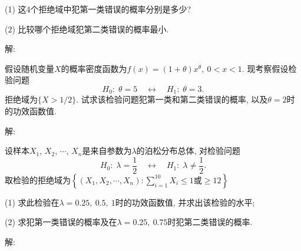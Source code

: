 \documentclass[standard]{ExBook}
\begin{document}
\begin{qitems}
\begin{bbox}
\begin{shaded}
(1) 这4个拒绝域中犯第一类错误的概率分别是多少?

(2) 比较哪个拒绝域犯第二类错误的概率最小.
    \end{shaded}
    \end{bbox}

\vspace{-5em}

    \begin{bbox}
解: 
    \end{bbox}

\vspace{-5em}

    \begin{bbox} 
    \begin{shaded}
        \qitem
假设随机变量$X$的概率密度函数为$f(x) = (1 + \theta)x^{\theta},\ 0 < x < 1$. 现考察假设检验问题
\[
H_0: \; \theta = 5 \quad \longleftrightarrow \quad H_1: \; \theta = 3.
\]
拒绝域为$\{X > 1/2\}$. 试求该检验问题犯第一类和第二类错误的概率, 以及$\theta = 2$时的功效函数值.
    \end{shaded}
    \end{bbox}

\vspace{-5em}

    \begin{bbox}
解: 
    \end{bbox}

\vspace{-5em}

    \begin{bbox} 
    \begin{shaded}
        \qitem
设样本$X_1$, $X_2$, $\cdots$, $X_n$是来自参数为$\lambda$的泊松分布总体, 对检验问题
\[
H_0: \; \lambda = \displaystyle\frac{1}{2} \quad \longleftrightarrow \quad H_1: \; \lambda \neq \displaystyle\frac{1}{2}.
\]
取检验的拒绝域为$\left\{\left(X_1,X_2,\cdots,X_n\right): \displaystyle\sum\limits_{i=1}^{10}X_{i} \leq 1 \text{或} \geq 12\right\}$

(1) 求此检验在$\lambda=0.25,\ 0.5,\ 1$时的功效函数值, 并求出该检验的水平;

(2) 求犯第一类错误的概率及在$\lambda=0.25,\ 0.75$时犯第二类错误的概率.
    \end{shaded}
    \end{bbox}

\vspace{-5em}

    \begin{bbox}
解: 
    \end{bbox}


\end{qitems}
\end{document}
